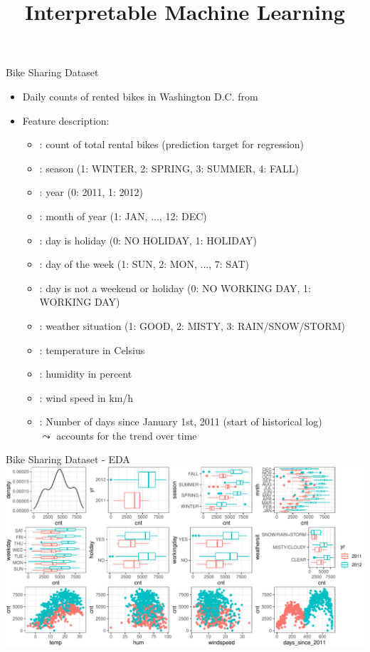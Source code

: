 \documentclass[11pt,compress,t,notes=noshow, aspectratio=169, xcolor=table]{beamer}
\title{Interpretable Machine Learning}
\date{}
\begin{document}
\newcommand{\titlefigure}{figure/open_blackbox}
\newcommand{\learninggoals}{
\item Introduce bike sharing data
\item Description of features
\item EDA of features}


\begin{frame}[t]{Bike Sharing Dataset }
\begin{itemize}
\item Daily counts of rented bikes in Washington D.C. from 
\item Feature description:
\begin{itemize}
\item {}: count of total rental bikes (prediction target for regression)
\item {}: season (1: WINTER, 2: SPRING, 3: SUMMER, 4: FALL)
\item {}: year (0: 2011, 1: 2012)
\item {}: month of year (1: JAN, ..., 12: DEC)
\item {}: day is holiday (0: NO HOLIDAY, 1: HOLIDAY)
\item {}: day of the week (1: SUN, 2: MON, ..., 7: SAT)
\item {}: day is not a weekend or holiday (0: NO WORKING DAY, 1: WORKING DAY)
\item {}: weather situation (1: GOOD, 2: MISTY, 3: RAIN/SNOW/STORM)
\item {}: temperature in Celsius
\item {}: humidity in percent
\item {}: wind speed in km/h
\item {}: Number of days since January 1st, 2011 (start of historical log)\\
$\leadsto$ accounts for the trend over time
\end{itemize}
\end{itemize}
\end{frame}


\begin{frame}[t]{Bike Sharing Dataset - EDA}
\includegraphics[width=\linewidth]{figure/intro_bike}
\end{frame}

\endlecture
\end{document}
